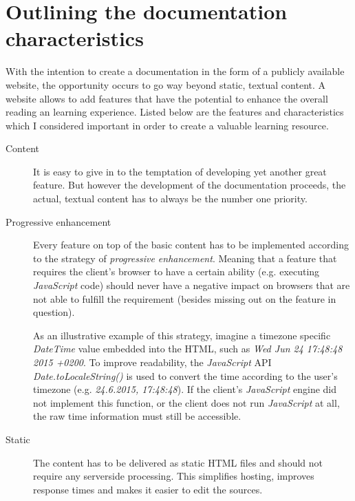 \section{Outlining the documentation characteristics}

With the intention to create a documentation in the form of a publicly available website, the opportunity occurs to go way beyond static, textual content. A website allows to add features that have the potential to enhance the overall reading an learning experience. Listed below are the features and characteristics which I considered important in order to create a valuable learning resource.

\begin{description}

	\item[Content]\hfill

	It is easy to give in to the temptation of developing yet another great feature. But however the development of the documentation proceeds, the actual, textual content has to always be the number one priority.

	\item[Progressive enhancement]\hfill

	Every feature on top of the basic content has to be implemented according to the strategy of \textit{progressive enhancement}. Meaning that a feature that requires the client's browser to have a certain ability (e.g. executing \textit{JavaScript} code) should never have a negative impact on browsers that are not able to fulfill the requirement (besides missing out on the feature in question).

	As an illustrative example of this strategy, imagine a timezone specific \textit{DateTime} value embedded into the \ac{HTML}, such as \textit{Wed Jun 24 17:48:48 2015 +0200}. To improve readability, the \textit{JavaScript} \ac{API} \textit{Date.toLocaleString()} is used to convert the time according to the user's timezone (e.g. \textit{24.6.2015, 17:48:48}). If the client's \textit{JavaScript} engine did not implement this function, or the client does not run \textit{JavaScript} at all, the raw time information must still be accessible.

	\item[Static]\hfill

	The content has to be delivered as static \ac{HTML} files and should not require any serverside processing. This simplifies hosting, improves response times and makes it easier to edit the sources.


\end{description}
